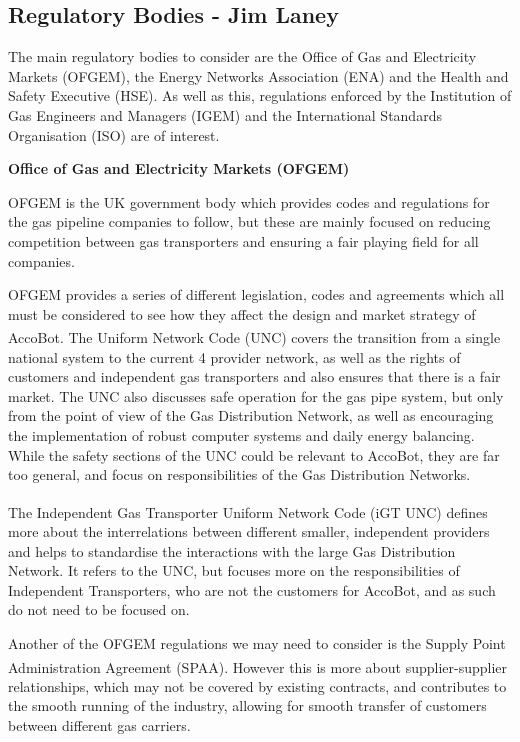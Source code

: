 \documentclass[11pt]{article}		%
\newcommand{\supercite}[1]{\textsuperscript{\cite{#1}}}		%
\begin{document}
		\subsection[Regulatory Bodies]{Regulatory Bodies - Jim Laney}
			
			The main regulatory bodies to consider are the Office of Gas and Electricity Markets (OFGEM), the Energy Networks Association (ENA) and the Health and Safety Executive (HSE).
			As well as this, regulations enforced by the Institution of Gas Engineers and Managers (IGEM) and the International Standards Organisation (ISO) are of interest.
 			
 			\textbf{Office of Gas and Electricity Markets (OFGEM)}
 			
			OFGEM is the UK government body which provides codes and regulations for the gas pipeline companies to follow, but these are mainly focused on reducing competition between gas transporters and ensuring a fair playing field for all companies.
			
			OFGEM provides a series of different legislation, codes and agreements which all must be considered to see how they affect the design and market strategy of AccoBot.
			The Uniform Network Code (UNC)\supercite{joint2005uniform} covers the transition from a single national system to the current 4 provider network, as well as the rights of customers and independent gas transporters and also ensures that there is a fair market.
			The UNC also discusses safe operation for the gas pipe system, but only from the point of view of the Gas Distribution Network, as well as encouraging the implementation of robust computer systems and daily energy balancing.
			While the safety sections of the UNC could be relevant to AccoBot, they are far too general, and focus on responsibilities of the Gas Distribution Networks.
			
			The Independent Gas Transporter Uniform Network Code (iGT UNC)\supercite{igt2021independent} defines more about the interrelations between different smaller, independent providers and helps to standardise the interactions with the large Gas Distribution Network.
			It refers to the UNC, but focuses more on the responsibilities of Independent Transporters, who are not the customers for AccoBot, and as such do not need to be focused on.
			
			Another of the OFGEM regulations we may need to consider is the Supply Point Administration Agreement (SPAA)\supercite{spaa2021supply}. 
			However this is more about supplier-supplier relationships, which may not be covered by existing contracts, and contributes to the smooth running of the industry, allowing for smooth transfer of customers between different gas carriers.
			
\end{document}
